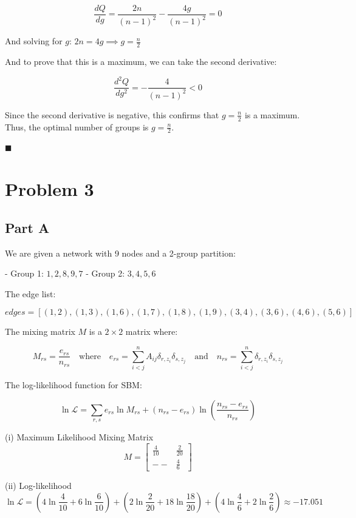 \documentclass[12pt]{article}
\begin{document}
$$
\frac{dQ}{dg} = \frac{2n}{(n-1)^2} - \frac{4g}{(n-1)^2} = 0
$$

And solving for $g$: $2n = 4g \implies g = \frac{n}{2}$

And to prove that this is a maximum, we can take the second derivative:

$$
\frac{d^2Q}{dg^2} = -\frac{4}{(n-1)^2} < 0
$$

Since the second derivative is negative, this confirms that $g = \frac{n}{2}$ is a maximum. Thus, the optimal number of groups is $g = \frac{n}{2}$.

\begin{flushright}
  \(\blacksquare\)
\end{flushright}

\section*{Problem 3}
\subsection*{Part A}

We are given a network with 9 nodes and a 2-group partition:

- Group 1: ${1, 2, 8, 9, 7}$
- Group 2: ${3, 4, 5, 6}$

The edge list:

$$
edges = [(1, 2), (1, 3), (1, 6), (1, 7), (1, 8), (1, 9), (3, 4), (3, 6), (4, 6), (5, 6)]
$$

The mixing matrix $M$ is a $2 \times 2$ matrix where:

$$
M_{rs} = \frac{e_{rs}}{n_{rs}} \quad \text{where} \quad e_{rs} = \sum_{i<j}^n A_{ij}\delta_{r,z_i}\delta_{s,z_j} \quad \text{and} \quad n_{rs} = \sum_{i<j}^n \delta_{r,z_i}\delta_{s,z_j}
$$


The log-likelihood function for SBM:

$$
\ln \mathcal{L} = \sum_{r,s} e_{rs} \ln M_{rs} + (n_{rs} - e_{rs})\ln(\frac{n_{rs} - e_{rs}}{n_{rs}})
$$

(i) Maximum Likelihood Mixing Matrix
$$
M = \begin{bmatrix} \frac{4}{10} & \frac{2}{20} \\ -- & \frac{4}{6} \end{bmatrix}
$$

(ii) Log-likelihood
$$
\ln \mathcal{L} = (4 \ln \frac{4}{10} + 6\ln \frac{6}{10}) + (2 \ln \frac{2}{20} + 18\ln \frac{18}{20}) + (4 \ln \frac{4}{6} + 2\ln \frac{2}{6})  \approx -17.051
$$
\end{document}
